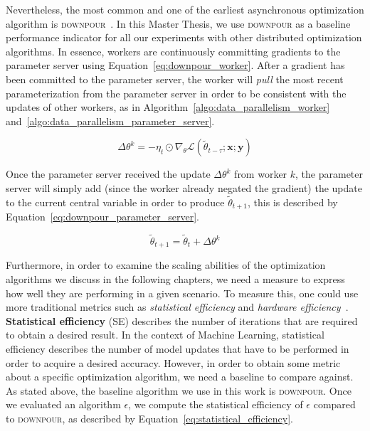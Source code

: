 Nevertheless, the most common and one of the earliest asynchronous optimization algorithm is \textsc{downpour}~\cite{dean2012large}. In this Master Thesis, we use \textsc{downpour} as a baseline performance indicator for all our experiments with other distributed optimization algorithms. In essence, workers are continuously committing gradients to the parameter server using Equation~\ref{eq:downpour_worker}. After a gradient has been committed to the parameter server, the worker will \emph{pull} the most recent parameterization from the parameter server in order to be consistent with the updates of other workers, as in Algorithm~\ref{algo:data_parallelism_worker} and~\ref{algo:data_parallelism_parameter_server}.

\begin{equation}
  \label{eq:downpour_worker}
  \Delta \theta^k = - \eta_t \odot \nabla_\theta \mathcal{L}(\tilde{\theta}_{t-\tau};\textbf{x};\textbf{y})
\end{equation}

\newpage

Once the parameter server received the update $\Delta\theta^k$ from worker $k$, the parameter server will simply add (since the worker already negated the gradient) the update to the current central variable in order to produce $\tilde{\theta}_{t+1}$, this is described by Equation~\ref{eq:downpour_parameter_server}.

\begin{equation}
  \label{eq:downpour_parameter_server}
  \tilde{\theta}_{t+1} = \tilde{\theta}_t + \Delta \theta^k
\end{equation}

Furthermore, in order to examine the scaling abilities of the optimization algorithms we discuss in the following chapters, we need a measure to express how well they are performing in a given scenario. To measure this, one could use more traditional metrics such as \emph{statistical efficiency} and \emph{hardware efficiency}~\cite{hadjis2016omnivore, implicitmomentum}.\\

\textbf{Statistical efficiency} (SE) describes the number of iterations that are required to obtain a desired result. In the context of Machine Learning, statistical efficiency describes the number of model updates that have to be performed in order to acquire a desired accuracy. However, in order to obtain some metric about a specific optimization algorithm, we need a baseline to compare against. As stated above, the baseline algorithm we use in this work is \textsc{downpour}. Once we evaluated an algorithm $\epsilon$, we compute the statistical efficiency of $\epsilon$ compared to \textsc{downpour}, as described by Equation~\ref{eq:statistical_efficiency}.

